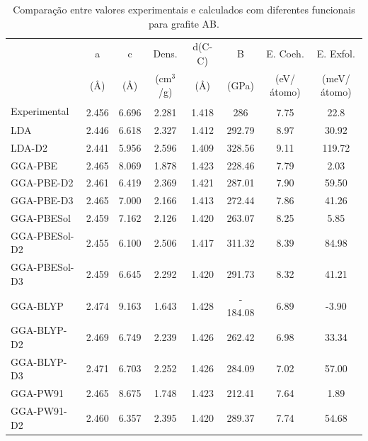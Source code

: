 		\begin{table}[]
			\centering
			\caption{Comparação entre valores experimentais e calculados com diferentes funcionais para grafite AB.}
			\label{grafite_AB}
			\renewcommand{\arraystretch}{1.2}
			\tiny\selectfont
			\begin{tabular}{l|ccccccc}
				\hline\hline
							  & a     & c     & Dens. & d(C-C) & B & E. Coeh. & E. Exfol. \\
				 			  & (\AA{}) & (\AA{}) & (cm$^3$/g) & (\AA{}) & (GPa) & (eV/átomo) & (meV/átomo)\\ \hline
				Experimental  & 2.456\textsuperscript{\cite{wyckoff1963crystal}} & 6.696\textsuperscript{\cite{wyckoff1963crystal}} &   2.281\textsuperscript{\cite{wyckoff1963crystal}}       &      1.418\textsuperscript{\cite{wyckoff1963crystal}}        & 286\textsuperscript{\cite{furthmuller1994ab}} &     7.75\textsuperscript{\cite{greenwood2012chemistry}}            &     22.8\textsuperscript{\cite{benedict1998microscopic}}      \\
				LDA           & 2.446 & 6.618 &   2.327       &      1.412        & 292.79  &     8.97           &    30.92      \\
				LDA-D2        & 2.441 & 5.956 &   2.596       &      1.409        & 328.56  &     9.11           &   119.72      \\
				GGA-PBE       & 2.465 & 8.069 &   1.878       &      1.423        & 228.46  &     7.79           &     2.03      \\
				GGA-PBE-D2    & 2.461 & 6.419 &   2.369       &      1.421        & 287.01  &     7.90           &    59.50      \\
				GGA-PBE-D3    & 2.465 & 7.000 &   2.166       &      1.413        & 272.44  &     7.86           &    41.26      \\
				GGA-PBESol    & 2.459 & 7.162 &   2.126       &      1.420        & 263.07  &     8.25           &     5.85      \\
				GGA-PBESol-D2 & 2.455 & 6.100 &   2.506       &      1.417        & 311.32  &     8.39           &    84.98      \\
				GGA-PBESol-D3 & 2.459 & 6.645 &   2.292       &      1.420        & 291.73  &     8.32           &    41.21      \\
				GGA-BLYP      & 2.474 & 9.163 &   1.643       &      1.428        &- 184.08  &     6.89           &    -3.90      \\
				GGA-BLYP-D2   & 2.469 & 6.749 &   2.239       &      1.426        & 262.42  &     6.98           &    33.34      \\
				GGA-BLYP-D3   & 2.471 & 6.703 &   2.252       &      1.426        & 284.09  &     7.02           &    57.00      \\
				GGA-PW91      & 2.465 & 8.675 &   1.748       &      1.423        & 212.41  &     7.64           &     1.89      \\
				GGA-PW91-D2   & 2.460 & 6.357 &   2.395       &      1.420        & 289.37  &     7.74           &    54.68      \\ \hline\hline           
			\end{tabular}
		\end{table}

